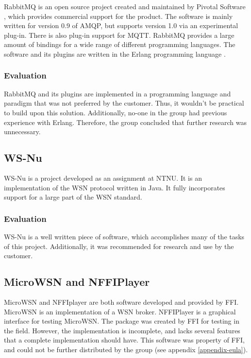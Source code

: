 RabbitMQ \cite{rabbit-mq} is an open source project created and maintained by Pivotal Software \cite{pivotal-software}, which provides commercial support for the product. The software is mainly written for version 0.9 of AMQP, but supports version 1.0 via an experimental plug-in. There is also plug-in support for MQTT. RabbitMQ provides a large amount of bindings for a wide range of different programming languages. The software and its plugins are written in the Erlang programming language \cite{erlang}.

\subsubsection{Evaluation}
\label{subsec:prestudies-existing_solutions-rabbitmq-evaluation}

RabbitMQ and its plugins are implemented in a programming language and paradigm that was not preferred by the customer. Thus, it wouldn't be practical to build upon this solution. Additionally, no-one in the group had previous experience with Erlang. Therefore, the group concluded that further research was unnecessary.

\subsection{WS-Nu}
\label{subsec:prestudies-existing_solutions-ws_nu}

WS-Nu is a project developed as an assignment at NTNU. It is an implementation of the WSN protocol written in Java. It fully incorporates support for a large part of the WSN standard.

\subsubsection{Evaluation}
\label{subsec:prestudies-existing_solution-ws_nu-evaluation}

WS-Nu is a well written piece of software, which accomplishes many of the tasks of this project. Additionally, it was recommended for research and use by the customer.

\subsection{MicroWSN and NFFIPlayer}
\label{subsec:prestudies-existing_solutions-micro_wsn_and_nffiplayer}

MicroWSN and NFFIplayer are both software developed and provided by FFI. MicroWSN is an implementation of a WSN broker. NFFIPlayer is a graphical interface for testing MicroWSN. The package was created by FFI for testing in the field. However, the implementation is incomplete, and lacks several features that a complete implementation should have. This software was property of FFI, and could not be further distributed by the group (see appendix \ref{appendix-eula}).

